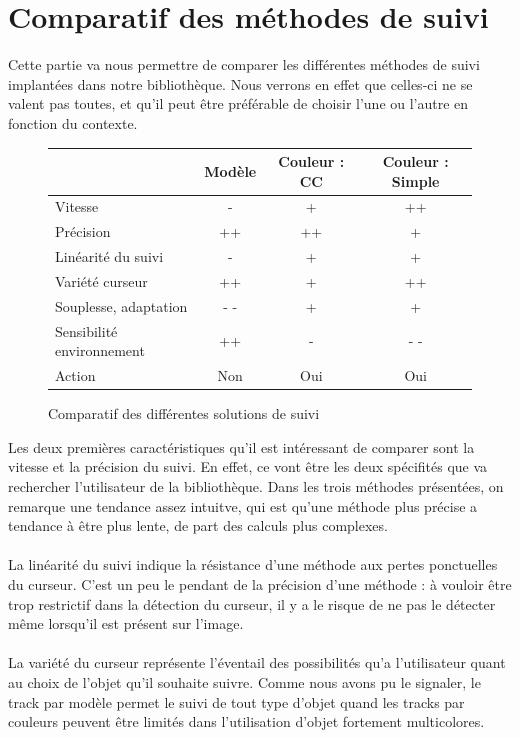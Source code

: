 \documentclass{report}
\begin{document}
		\section{Comparatif des méthodes de suivi}
		Cette partie va nous permettre de comparer les différentes méthodes de suivi implantées dans notre bibliothèque. Nous verrons en effet que celles-ci ne se valent pas toutes, et qu'il peut être préférable de choisir l'une ou l'autre en fonction du contexte.
				        \begin{figure}[h]
				\Large{
				\begin{center}
				\begin{tabular}{|l|c|c|c|}
				\hline
				\backslashbox{Caractéristique}{\quad Méthode}& Modèle  &Couleur : CC & Couleur : Simple  \\
				\hline
				Vitesse & -& + & ++ \\
				\hline
				Précision &++&++&+\\
				\hline
				Linéarité du suivi&-&+&+\\
				\hline
				Variété curseur &++&+&++\\
				\hline
				Souplesse, adaptation & - - & + &+\\
				\hline
				Sensibilité environnement &++&-&- -\\
				\hline
				Action &Non & Oui & Oui \\
				\hline
				\end{tabular}
				\end{center}
				\caption{Comparatif des différentes solutions de suivi}
				\label{tableau comparatif}}
				\end{figure}
				
			Les deux premières caractéristiques qu'il est intéressant de comparer sont la vitesse et la précision du suivi. En effet, ce vont être les deux spécifités que va rechercher l'utilisateur de la bibliothèque. Dans les trois méthodes présentées, on remarque une tendance assez intuitve, qui est qu'une méthode plus précise a tendance à être plus lente, de part des calculs plus complexes.
			\paragraph{}
			La linéarité du suivi indique la résistance d'une méthode aux pertes ponctuelles du curseur. C'est un peu le pendant de la précision d'une méthode : à vouloir être trop restrictif dans la détection du curseur, il y a le risque de ne pas le détecter même lorsqu'il est présent sur l'image.
			\paragraph{}
			La variété du curseur représente l'éventail des possibilités qu'a l'utilisateur quant au choix de l'objet qu'il souhaite suivre. Comme nous avons pu le signaler, le track par modèle permet le suivi de tout type d'objet quand les tracks par couleurs peuvent être limités dans l'utilisation d'objet fortement multicolores.
\end{document}

